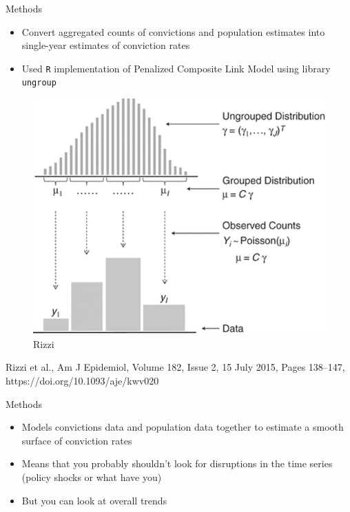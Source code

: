 \documentclass[
  ignorenonframetext,
]{beamer}
\begin{document}
\begin{frame}[fragile]{Methods}
\protect\hypertarget{methods}{}
\begin{itemize}
\item
  Convert aggregated counts of convictions and population estimates into
  single-year estimates of conviction rates
\item
  Used \texttt{R} implementation of Penalized Composite Link Model using
  library \texttt{ungroup}
\end{itemize}

\begin{figure}

{\centering \includegraphics{resources/rizzi-2015-figure_one.png}

}

\caption{Rizzi}

\end{figure}

Rizzi et al., Am J Epidemiol, Volume 182, Issue 2, 15 July 2015, Pages
138--147, https://doi.org/10.1093/aje/kwv020
\end{frame}

\begin{frame}{Methods}
\protect\hypertarget{methods-1}{}
\begin{itemize}
\item
  Models convictions data and population data together to estimate a
  smooth surface of conviction rates
\item
  Means that you probably shouldn't look for disruptions in the time
  series (policy shocks or what have you)
\item
  But you can look at overall trends
\end{itemize}
\end{frame}
\end{document}

